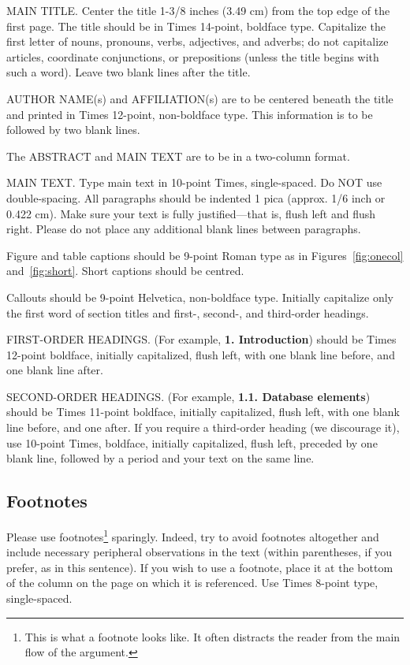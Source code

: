 \documentclass[12pt,letterpaper]{article}
\begin{document}
MAIN TITLE. Center the title 1-3/8 inches (3.49 cm) from the top edge of
the first page. The title should be in Times 14-point, boldface type.
Capitalize the first letter of nouns, pronouns, verbs, adjectives, and
adverbs; do not capitalize articles, coordinate conjunctions, or
prepositions (unless the title begins with such a word). Leave two blank
lines after the title.

AUTHOR NAME(s) and AFFILIATION(s) are to be centered beneath the title
and printed in Times 12-point, non-boldface type. This information is to
be followed by two blank lines.

The ABSTRACT and MAIN TEXT are to be in a two-column format.

MAIN TEXT. Type main text in 10-point Times, single-spaced. Do NOT use
double-spacing. All paragraphs should be indented 1 pica (approx. 1/6
inch or 0.422 cm). Make sure your text is fully justified---that is,
flush left and flush right. Please do not place any additional blank
lines between paragraphs.

Figure and table captions should be 9-point Roman type as in
Figures~\ref{fig:onecol} and~\ref{fig:short}.  Short captions should be centred.

\noindent Callouts should be 9-point Helvetica, non-boldface type.
Initially capitalize only the first word of section titles and first-,
second-, and third-order headings.

FIRST-ORDER HEADINGS. (For example, {\large \bf 1. Introduction})
should be Times 12-point boldface, initially capitalized, flush left,
with one blank line before, and one blank line after.

SECOND-ORDER HEADINGS. (For example, { \bf 1.1. Database elements})
should be Times 11-point boldface, initially capitalized, flush left,
with one blank line before, and one after. If you require a third-order
heading (we discourage it), use 10-point Times, boldface, initially
capitalized, flush left, preceded by one blank line, followed by a period
and your text on the same line.

\subsection{Footnotes}

Please use footnotes\footnote {This is what a footnote looks like.  It
often distracts the reader from the main flow of the argument.} sparingly.
Indeed, try to avoid footnotes altogether and include necessary peripheral
observations in
the text (within parentheses, if you prefer, as in this sentence).  If you
wish to use a footnote, place it at the bottom of the column on the page on
which it is referenced. Use Times 8-point type, single-spaced.
\end{document}
